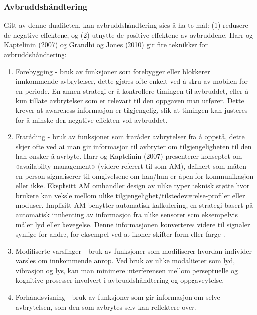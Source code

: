 \subsubsection{Avbruddshåndtering}
Gitt av denne dualiteten, kan avbruddshåndtering sies å ha to mål: (1) redusere de negative effektene, og (2) utnytte de positive effektene av avbruddene. Harr og Kaptelinin (2007) og Grandhi og Jones (2010) gir fire teknikker for avbruddshåndtering:
\begin{enumerate}        
\item Forebygging - bruk av funksjoner som forebygger eller blokkerer innkommende avbrytelser, dette gjøres ofte enkelt ved å skru av mobilen for en periode. En annen strategi er å kontrollere timingen til avbruddet, eller å kun tillate avbrytelser som er relevant til den oppgaven man utfører. Dette krever at awareness-informasjon er tilgjengelig, slik at timingen kan justeres for å minske den negative effekten ved avbruddet.

\item Fraråding - bruk av funksjoner som fraråder avbrytelser fra å oppstå, dette skjer ofte ved at man gir informasjon til avbryter om tilgjengeligheten til den han ønsker å avrbyte. Harr og Kaptelinin (2007) presenterer konseptet om «availabilty management» (videre referert til som AM), definert som måten en person signaliserer til omgivelsene om han/hun er åpen for kommunikasjon eller ikke.
\noindent
Eksplisitt AM omhandler design av ulike typer teknisk støtte hvor brukere kan veksle mellom ulike tilgjengelighet/tilstedeværelse-profiler eller moduser. Implisitt AM benytter automatisk kalkulering, en strategi basert på automatisk innhenting  av informasjon fra ulike sensorer som eksempelvis måler lyd eller bevegelse. Denne informasjonen konverteres videre til signaler synlige for andre, for eksempel ved at ikoner skifter form eller farge \cite{Harr07}.  

\item Modifiserte varslinger - bruk av funksjoner som modifiserer hvordan individer varsles om innkommende anrop. Ved bruk av ulike modaliteter som lyd, vibrasjon og lys, kan man minimere interferensen mellom perseptuelle og kognitive prosesser involvert i avbruddshåndtering og oppgaveytelse.

\item Forhåndsvisning - bruk av funksjoner som gir informasjon om selve avbrytelsen, som den som avbrytes selv kan reflektere over.   
\end{enumerate}

